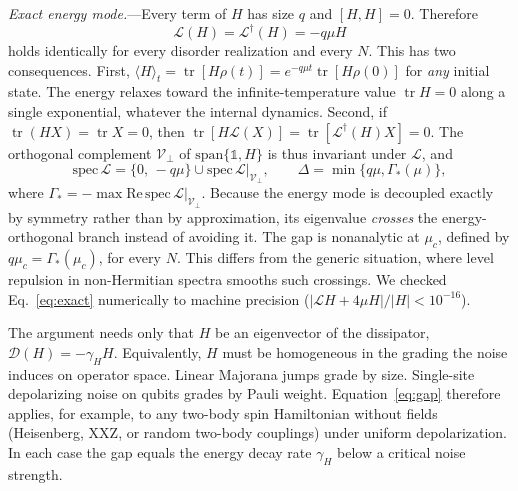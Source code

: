 \documentclass[aps,prl,twocolumn,superscriptaddress,amsmath,amssymb,10pt]{revtex4-2}
\newcommand{\Lc}{\mathcal{L}}
\newcommand{\tr}{\operatorname{tr}}
\begin{document}
\emph{Exact energy mode.}---Every term of $H$ has size $q$ and $[H,H]=0$. Therefore
\begin{equation}
\Lc(H)=\Lc^\dagger(H)=-q\mu H
\label{eq:exact}
\end{equation}
holds identically for every disorder realization and every $N$. This has two consequences. First, $\langle H\rangle_t=\tr[H\rho(t)]=e^{-q\mu t}\tr[H\rho(0)]$ for \emph{any} initial state. The energy relaxes toward the infinite-temperature value $\tr H=0$ along a single exponential, whatever the internal dynamics. Second, if $\tr(HX)=\tr X=0$, then $\tr[H\Lc(X)]=\tr[\Lc^\dagger(H)X]=0$. The orthogonal complement $\mathcal{V}_\perp$ of $\mathrm{span}\{\mathbb 1,H\}$ is thus invariant under $\Lc$, and
\begin{equation}
\mathrm{spec}\,\Lc=\{0,\,-q\mu\}\cup\mathrm{spec}\,\Lc|_{\mathcal V_\perp},\qquad \Delta=\min\{q\mu,\Gamma_\ast(\mu)\},
\label{eq:gap}
\end{equation}
where $\Gamma_\ast=-\max\mathrm{Re}\,\mathrm{spec}\,\Lc|_{\mathcal V_\perp}$. Because the energy mode is decoupled exactly by symmetry rather than by approximation, its eigenvalue \emph{crosses} the energy-orthogonal branch instead of avoiding it. The gap is nonanalytic at $\mu_c$, defined by $q\mu_c=\Gamma_\ast(\mu_c)$, for every $N$. This differs from the generic situation, where level repulsion in non-Hermitian spectra smooths such crossings. We checked Eq.~\eqref{eq:exact} numerically to machine precision ($|\Lc H+4\mu H|/|H|<10^{-16}$).

The argument needs only that $H$ be an eigenvector of the dissipator, $\mathcal D(H)=-\gamma_HH$. Equivalently, $H$ must be homogeneous in the grading the noise induces on operator space. Linear Majorana jumps grade by size. Single-site depolarizing noise on qubits grades by Pauli weight. Equation~\eqref{eq:gap} therefore applies, for example, to any two-body spin Hamiltonian without fields (Heisenberg, XXZ, or random two-body couplings) under uniform depolarization. In each case the gap equals the energy decay rate $\gamma_H$ below a critical noise strength.
\end{document}
